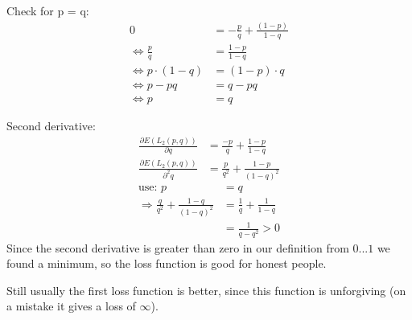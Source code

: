 Check for p = q:
\begin{align*}
0 &= -\frac{p}{q} + \frac{\left(1 - p\right)}{1-q} \\
\Leftrightarrow \frac{p}{q} &= \frac{1-p}{1-q} \\
\Leftrightarrow p \cdot \left(1 - q\right) &= \left(1 - p\right) \cdot q \\
\Leftrightarrow p - pq &= q - pq \\
\Leftrightarrow p &= q
\end{align*}

Second derivative:
\begin{align*}
\frac{\partial E\left(L_2\left(p, q\right)\right)}{\partial q} &= \frac{-p}{q} + \frac{1-p}{1-q} \\
\frac{\partial E\left(L_2\left(p, q\right)\right)}{\partial^2 q} &= \frac{p}{q^2} + \frac{1-p}{\left(1-q\right)^2}
\end{align*}
\begin{align*}
\text{use: } p &= q\\
\Rightarrow \frac{q}{q^2} + \frac{1-q}{\left(1-q\right)^2} &= \frac{1}{q} + \frac{1}{1-q} \\
&= \frac{1}{q-q^2} > 0
\end{align*}
Since the second derivative is greater than zero in our definition from $0...1$ we found a minimum, so the loss function is good for honest people.

Still usually the first loss function is better, since this function is unforgiving (on a mistake it gives a loss of $\infty$).